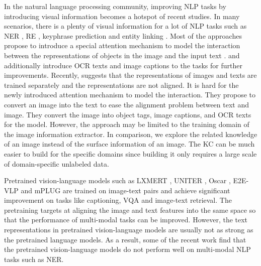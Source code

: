 \documentclass[11pt]{article}
\begin{document}
In the natural language processing community, improving NLP tasks by introducing visual information becomes a hotspot of recent studies. In many scenarios, there is  a plenty of visual information for a lot of NLP tasks such as NER  \citep{zhang2018adaptive,moon-etal-2018-multimodal,lu-etal-2018-visual}, RE \citep{zheng2021multimodal,zheng2021mnre}, keyphrase prediction \citep{wang-etal-2020-cross-media} and entity linking \citep{10.1145/3474085.3475400,10.1007/978-3-030-73197-7_35,wang2022wikidiverse}. Most of the approaches propose to introduce a special attention mechanism to model the interaction between the representations of objects in the image and the input text \cite{zhang2018adaptive,yu-etal-2020-improving-multimodal,Sun2021RpBERTAT,wang-etal-2020-cross-media,zheng2021multimodal}. \citet{wang-etal-2020-cross-media} and \citet{wang2022ita} additionally introduce OCR texts and image captions to the tasks for further improvements. Recently, \citet{wang2022ita} suggests that the representations of images and texts are trained separately and the representations are not aligned. It is hard for the newly introduced attention mechanism to model the interaction. They
propose to convert an image into the text to ease the alignment problem between text and image. They convert the image into object tags, image captions, and OCR texts for the model. However, the approach may be limited to the training domain of the image information extractor. In comparison, we explore the related knowledge of an image instead of the surface information of an image. The KC can be much easier to build for the specific domains since building it only requires a large scale of domain-specific unlabeled data.

Pretrained vision-language models such as LXMERT \cite{tan-bansal-2019-lxmert}, UNITER \citep{chen2020uniter}, Oscar \citep{li2020oscar}, E2E-VLP \cite{xu-etal-2021-e2e} and mPLUG \cite{li2022mplug} are trained on image-text pairs and achieve significant improvement on tasks like captioning, VQA and image-text retrieval. The pretraining targets at aligning the image and text features into the same space so that the performance of multi-modal tasks can be improved. However, the text representations in pretrained vision-language models are usually not as strong as the pretrained language models. As a result, some of the recent work \cite{Sun2021RpBERTAT,wang2022ita} find that the pretrained vision-language models do not perform well on multi-modal NLP tasks such as NER.
\end{document}
